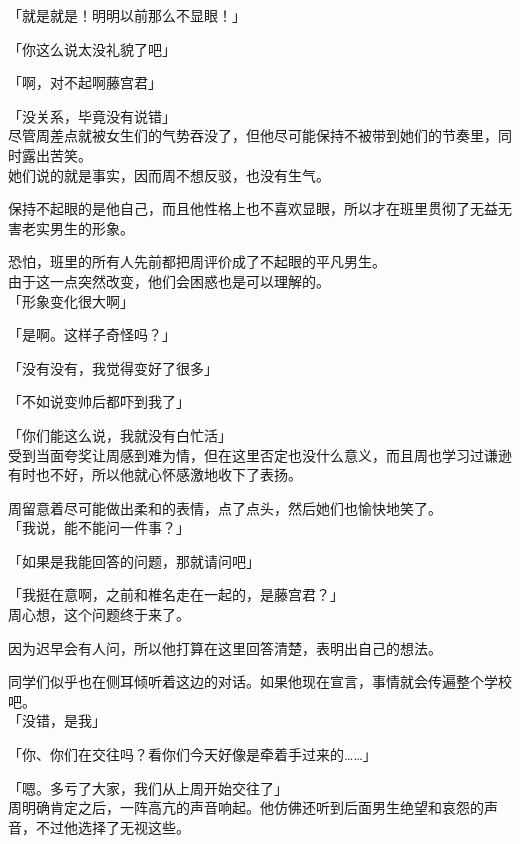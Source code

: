 「就是就是！明明以前那么不显眼！」

「你这么说太没礼貌了吧」

「啊，对不起啊藤宫君」

「没关系，毕竟没有说错」\\

尽管周差点就被女生们的气势吞没了，但他尽可能保持不被带到她们的节奏里，同时露出苦笑。\\

她们说的就是事实，因而周不想反驳，也没有生气。

保持不起眼的是他自己，而且他性格上也不喜欢显眼，所以才在班里贯彻了无益无害老实男生的形象。

恐怕，班里的所有人先前都把周评价成了不起眼的平凡男生。\\

由于这一点突然改变，他们会困惑也是可以理解的。\\

「形象变化很大啊」

「是啊。这样子奇怪吗？」

「没有没有，我觉得变好了很多」

「不如说变帅后都吓到我了」

「你们能这么说，我就没有白忙活」\\

受到当面夸奖让周感到难为情，但在这里否定也没什么意义，而且周也学习过谦逊有时也不好，所以他就心怀感激地收下了表扬。

周留意着尽可能做出柔和的表情，点了点头，然后她们也愉快地笑了。\\

「我说，能不能问一件事？」

「如果是我能回答的问题，那就请问吧」

「我挺在意啊，之前和椎名走在一起的，是藤宫君？」\\

周心想，这个问题终于来了。

因为迟早会有人问，所以他打算在这里回答清楚，表明出自己的想法。

同学们似乎也在侧耳倾听着这边的对话。如果他现在宣言，事情就会传遍整个学校吧。\\

「没错，是我」

「你、你们在交往吗？看你们今天好像是牵着手过来的……」

「嗯。多亏了大家，我们从上周开始交往了」\\

周明确肯定之后，一阵高亢的声音响起。他仿佛还听到后面男生绝望和哀怨的声音，不过他选择了无视这些。

